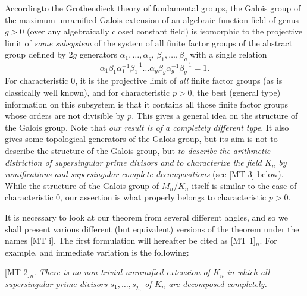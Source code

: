 \begin{remark}\label{art6-rem1}
According\pageoriginale to the Grothendieck theory of fundamental groups, the Galois group of the maximum unramified Galois extension of an algebraic function field of genus $g > 0$ (over any algebraically closed constant field) is isomorphic to the projective limit of \textit{some subsystem} of the system of all finite factor groups of the abstract group defined by $2g$ generators $\alpha_1, \ldots, \alpha_g$, $\beta_1, \ldots, \beta_g$ with a single relation
$$
\alpha_1 \beta_1 \alpha^{-1}_1 \beta^{-1}_1 \ldots \alpha_g \beta_g \alpha_g^{-1} \beta^{-1}_g = 1.
$$
For characteristic 0, it is the projective limit of \textit{all} finite factor groups (as is classically well known), and for characteristic $p>0$, the best (general type) information on this subsystem is that it contains all those finite factor groups whose orders are not divisible by $p$. This gives a general idea on the structure of the Galois group. Note that \textit{our result is of a completely different type}. It also gives some topological generators of the Galois group, but its aim is not to describe the structure of the Galois group, but \textit{to describe the arithmetic distriction of supersingular prime divisors and to characterize the field $K_n$ by ramifications and supersingular complete decompositions} (see [MT 3] below). While the structure of the Galois group of $M_n/K_n$  itself is similar to the case of characteristic 0, our assertion is what properly belongs to characteristic $p>0$.

It is necessary to look at our theorem from several different angles, and so we shall present various different (but equivalent) versions of the theorem under the names [MT i]. The first formulation will hereafter be cited as [MT 1]$_n$. For example, and immediate variation is the following:

[MT 2]$_n$. \textit{There is no non-trivial unramified extension of $K_n$ in which all supersingular prime divisors $s_1, \ldots, s_{j_n}$ of $K_n$ are decomposed completely.}
\end{remark}

